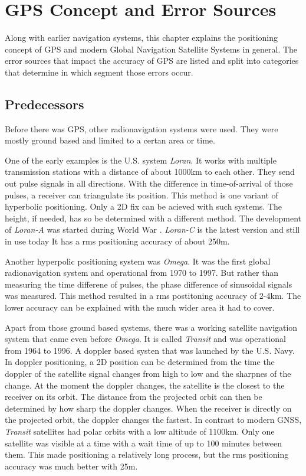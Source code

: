 \chapter{GPS Concept and Error Sources}\label{ch:GPS_concept}

Along with earlier navigation systems, this chapter explains the positioning concept of GPS and modern Global Navigation Satellite Systems in general.
The error sources that impact the accuracy of GPS are listed and split into categories that determine in which segment those errors occur.


\section{Predecessors}
Before there was GPS, other radionavigation systems were used.
They were mostly ground based and limited to a certan area or time.

One of the early examples is the U.S. system \textit{Loran}.
It works with multiple transmission stations with a distance of about 1000km to each other.
They send out pulse signals in all directions.
With the difference in time-of-arrival of those pulses, a receiver can triangulate its position.
This method is one variant of hyperbolic positioning.
Only a 2D fix can be acieved with such systems.
The height, if needed, has so be determined with a different method.
The development of \textit{Loran-A} was started during World War .
\textit{Loran-C} is the latest version and still in use today
It has a rms positioning accuracy of about 250m.

Another hyperpolic positioning system was \textit{Omega}.
It was the first global radionavigation system and operational from 1970 to 1997.
But rather than measuring the time differene of pulses, the phase difference of sinusoidal signals was measured.
This method resulted in a rms postitoning accuracy of 2-4km.
The lower accuracy can be explained with the much wider area it had to cover.

Apart from those ground based systems, there was a working satellite navigation system that came even before \textit{Omega}.
It is called \textit{Transit} and was operational from 1964 to 1996.
A doppler based systen that was launched by the U.S. Navy.
In doppler positioning, a 2D position can be determined from the time the doppler of the satellite signal changes from high to low and the sharpnes of the change.
At the moment the doppler changes, the satellite is the closest to the receiver on its orbit.
The distance from the projected orbit can then be determined by how sharp the doppler changes.
When the receiver is directly on the projected orbit, the doppler changes the fastest.
In contrast to modern GNSS, \textit{Transit} satellites had polar orbits with a low altitude of 1100km.
Only one satellite was visible at a time with a wait time of up to 100 minutes between them.
This made positioning a relatively long process, but the rms positioning accuracy was much better with 25m.


